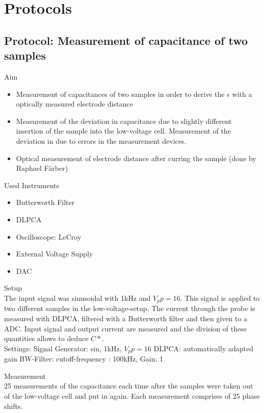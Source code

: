 \chapter{Protocols}
\section{Protocol: Measurement of capacitance of two samples}
\large{Aim} \\
\begin{itemize}

\item Measurement of capacitances of two samples in order to derive the $\epsilon$ with a optically measured electrode distance 
\item Measurement of the deviation in capacitance due to slightly different insertion of the sample into the low-voltage cell. Measurement of the deviation in due to errors in the measurement devices. 
\item Optical measurement of electrode distance after curring the sample (done by Raphael F\"arber) 
\end{itemize}

\large{Used Instruments} 
\begin{itemize}
 \item Butterworth Filter
 \item DLPCA
 \item Oscilloscope: LeCroy
 \item External Voltage Supply
 \item DAC 

\end{itemize}


\large{Setup} \\
The input signal was  sinusoidal with 1kHz and $V_pp=16$. This signal is applied to two different samples in the low-voltage-setup. The current through the probe is measured with DLPCA, filtered with a Butterworth filter and then given to a ADC. 
Input signal and output current are measured and the division of these quantities allows to deduce $C*$.\\

Settings: \newline
Signal Generator:  sin, 1kHz, $V_pp=16$
DLPCA:  automatically adapted gain
BW-Filter:  cutoff-frequency : 100kHz, Gain: 1

\large{Measurement} \\
25 measurements of the capacitance each time after the samples were taken out of the low-voltage cell and put in again. Each measurement comprises of 25 phase shifts. 

